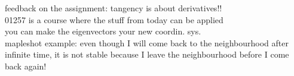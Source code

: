 feedback on the assignment: tangency is about derivatives!!\\
01257 is a course where the stuff from today can be applied\\
you can make the eigenvectors your new coordin. sys.\\
mapleshot example: even though I will come back to the neighbourhood  after infinite time, it is not stable because I leave the neighbourhood before I come back again!